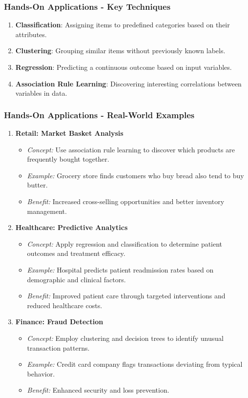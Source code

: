 \documentclass{beamer}
\begin{document}
\begin{frame}[fragile]
    \frametitle{Hands-On Applications - Key Techniques}
    \begin{enumerate}
        \item \textbf{Classification}: Assigning items to predefined categories based on their attributes.
        \item \textbf{Clustering}: Grouping similar items without previously known labels.
        \item \textbf{Regression}: Predicting a continuous outcome based on input variables.
        \item \textbf{Association Rule Learning}: Discovering interesting correlations between variables in data.
    \end{enumerate}
\end{frame}

\begin{frame}[fragile]
    \frametitle{Hands-On Applications - Real-World Examples}
    \begin{enumerate}
        \item \textbf{Retail: Market Basket Analysis}
            \begin{itemize}
                \item \textit{Concept:} Use association rule learning to discover which products are frequently bought together.
                \item \textit{Example:} Grocery store finds customers who buy bread also tend to buy butter.
                \item \textit{Benefit:} Increased cross-selling opportunities and better inventory management.
            \end{itemize}

        \item \textbf{Healthcare: Predictive Analytics}
            \begin{itemize}
                \item \textit{Concept:} Apply regression and classification to determine patient outcomes and treatment efficacy.
                \item \textit{Example:} Hospital predicts patient readmission rates based on demographic and clinical factors.
                \item \textit{Benefit:} Improved patient care through targeted interventions and reduced healthcare costs.
            \end{itemize}

        \item \textbf{Finance: Fraud Detection}
            \begin{itemize}
                \item \textit{Concept:} Employ clustering and decision trees to identify unusual transaction patterns.
                \item \textit{Example:} Credit card company flags transactions deviating from typical behavior.
                \item \textit{Benefit:} Enhanced security and loss prevention.
            \end{itemize}
    \end{enumerate}
\end{frame}
\end{document}
